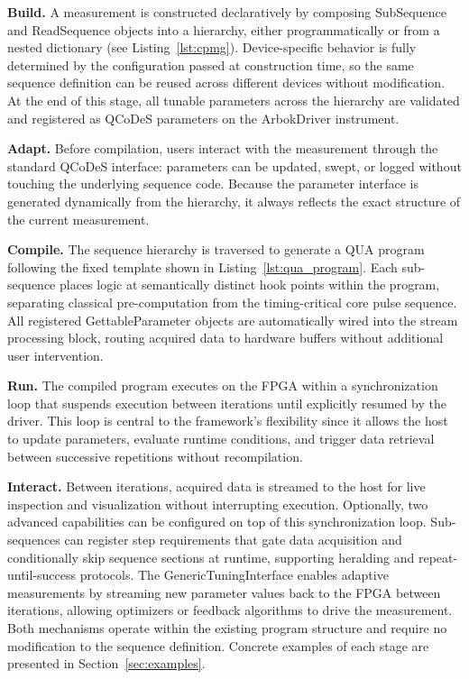 \documentclass[numbers, preprint, twocolumn,10pt]{elsarticle}
\begin{document}
\noindent
\textbf{Build.}
A measurement is constructed declaratively by composing SubSequence and ReadSequence objects into a hierarchy, either programmatically or from a nested dictionary (see Listing~\ref{lst:cpmg}). Device-specific behavior is fully determined by the configuration passed at construction time, so the same sequence definition can be reused across different devices without modification. At the end of this stage, all tunable parameters across the hierarchy are validated and registered as QCoDeS parameters on the ArbokDriver instrument.

\noindent
\textbf{Adapt.}
Before compilation, users interact with the measurement through the standard QCoDeS interface: parameters can be updated, swept, or logged without touching the underlying sequence code. Because the parameter interface is generated dynamically from the hierarchy, it always reflects the exact structure of the current measurement.

\noindent
\textbf{Compile.}
The sequence hierarchy is traversed to generate a QUA program following the fixed template shown in Listing~\ref{lst:qua_program}. Each sub-sequence places logic at semantically distinct hook points within the program, separating classical pre-computation from the timing-critical core pulse sequence. All registered GettableParameter objects are automatically wired into the stream processing block, routing acquired data to hardware buffers without additional user intervention.

\noindent
\textbf{Run.}
The compiled program executes on the FPGA within a synchronization loop that suspends execution between iterations until explicitly resumed by the driver. This loop is central to the framework's flexibility since it allows the host to update parameters, evaluate runtime conditions, and trigger data retrieval between successive repetitions without recompilation.

\noindent
\textbf{Interact.}
Between iterations, acquired data is streamed to the host for live inspection and visualization without interrupting execution. Optionally, two advanced capabilities can be configured on top of this synchronization loop. Sub-sequences can register step requirements that gate data acquisition and conditionally skip sequence sections at runtime, supporting heralding and repeat-until-success protocols. The GenericTuningInterface enables adaptive measurements by streaming new parameter values back to the FPGA between iterations, allowing optimizers or feedback algorithms to drive the measurement. Both mechanisms operate within the existing program structure and require no modification to the sequence definition.
Concrete examples of each stage are presented in Section~\ref{sec:examples}.
\end{document}
